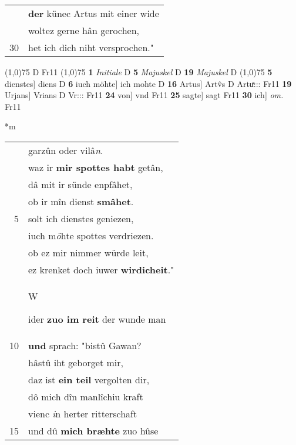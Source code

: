 \documentclass[8pt,a4paper,notitlepage]{article}
\begin{document}
\begin{table}[ht]
\begin{minipage}[t]{0.5\linewidth}
\begin{tabular}{rl}
 & \textbf{der} künec Artus mit einer wide\\ 
 & woltez gerne hân gerochen,\\ 
30 & het ich dich niht versprochen."\\ 
\end{tabular}
\scriptsize
\line(1,0){75} \newline
D Fr11 \newline
\line(1,0){75} \newline
\textbf{1} \textit{Initiale} D  \textbf{5} \textit{Majuskel} D  \textbf{19} \textit{Majuskel} D  \newline
\line(1,0){75} \newline
\textbf{5} dienstes] diens D \textbf{6} iuch möhte] ich mohte D \textbf{16} Artus] Artv̂s D Artuͯ::: Fr11 \textbf{19} Urjans] Vrians D Vr::: Fr11 \textbf{24} von] vnd Fr11 \textbf{25} sagte] sagt Fr11 \textbf{30} ich] \textit{om.} Fr11 \newline
\end{minipage}
\hspace{0.5cm}
\begin{minipage}[t]{0.5\linewidth}
\small
\begin{center}*m
\end{center}
\begin{tabular}{rl}
 & garzûn oder vilâ\textit{n}.\\ 
 & waz ir \textbf{mir spottes habt} getân,\\ 
 & dâ mit ir sünde enpfâhet,\\ 
 & ob ir mîn dienst \textbf{smâhet}.\\ 
5 & solt ich dienstes geniezen,\\ 
 & iuch m\textit{ö}hte spottes verdriezen.\\ 
 & ob ez mir nimmer würde leit,\\ 
 & ez krenket doch iuwer \textbf{wirdicheit}."\\ 
 & \begin{large}W\end{large}ider \textbf{zuo im reit} der wunde man\\ 
10 & \textbf{und} sprach: "bistû Gawan?\\ 
 & hâstû iht geborget mir,\\ 
 & daz ist \textbf{ein teil} vergolten dir,\\ 
 & dô mich dîn manlîchiu kraft\\ 
 & vienc \textit{i}n herter ritterschaft\\ 
15 & und dû \textbf{mich bræhte} zuo hûse\\ 

\end{tabular}
\end{minipage}
\end{table}
\end{document}
